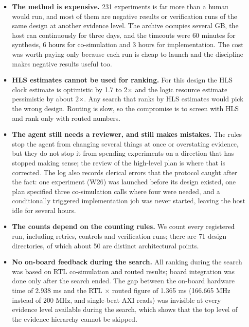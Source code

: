 \begin{itemize}
\item \textbf{The method is expensive.} 231 experiments is far more than a human would run, and most of them are negative results or verification runs of the same design at another evidence level. The archive occupies several GB, the host ran continuously for three days, and the timeouts were 60 minutes for synthesis, 6 hours for co-simulation and 3 hours for implementation. The cost was worth paying only because each run is cheap to launch and the discipline makes negative results useful too.
\item \textbf{HLS estimates cannot be used for ranking.} For this design the HLS clock estimate is optimistic by 1.7 to 2$\times$ and the logic resource estimate pessimistic by about 2$\times$. Any search that ranks by HLS estimates would pick the wrong design. Routing is slow, so the compromise is to screen with HLS and rank only with routed numbers.
\item \textbf{The agent still needs a reviewer, and still makes mistakes.} The rules stop the agent from changing several things at once or overstating evidence, but they do not stop it from spending experiments on a direction that has stopped making sense; the review of the high-level plan is where that is corrected. The log also records clerical errors that the protocol caught after the fact: one experiment (W26) was launched before its design existed, one plan specified three co-simulation calls where four were needed, and a conditionally triggered implementation job was never started, leaving the host idle for several hours.
\item \textbf{The counts depend on the counting rules.} We count every registered run, including retries, controls and verification runs; there are 71 design directories, of which about 50 are distinct architectural points.
\item \textbf{No on-board feedback during the search.} All ranking during the search was based on RTL co-simulation and routed results; board integration was done only after the search ended. The gap between the on-board hardware time of 2.938 ms and the RTL $\times$ routed figure of 1.365 ms (166.665 MHz instead of 200 MHz, and single-beat AXI reads) was invisible at every evidence level available during the search, which shows that the top level of the evidence hierarchy cannot be skipped.
\end{itemize}

